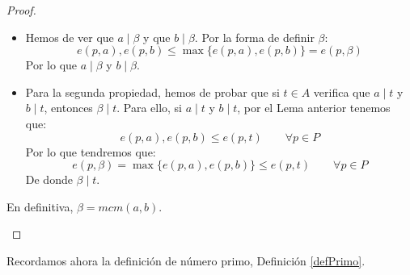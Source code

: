 \begin{prop}
\begin{proof}
\begin{itemize}
\begin{itemize}
                \item Hemos de ver que $a \mid \beta$ y que $b \mid \beta$. Por la forma de definir $\beta$:
                    \begin{equation*}
                        e(p,a), e(p,b) \leq \max\{e(p,a),e(p,b)\} = e(p,\beta)
                    \end{equation*}
                    Por lo que $a \mid \beta$ y $b\mid \beta$.
                \item Para la segunda propiedad, hemos de probar que si $t\in A$ verifica que $a\mid t$ y $b\mid t$, entonces $\beta \mid t$. Para ello, si $a \mid t$ y $b\mid t$, por el Lema anterior tenemos que:
                    \begin{equation*}
                        e(p,a),e(p,b) \leq e(p,t)\qquad \forall p\in P
                    \end{equation*}
                    Por lo que tendremos que:
                    \begin{equation*}
                        e(p,\beta) = \max\{e(p,a),e(p,b)\} \leq e(p,t) \qquad \forall p\in P
                    \end{equation*}
                    De donde $\beta \mid t$.
            \end{itemize}
            En definitiva, $\beta = mcm(a,b)$.
    \end{itemize}
\end{proof}
\end{prop}

Recordamos ahora la definición de número primo, Definición \ref{defPrimo}.

